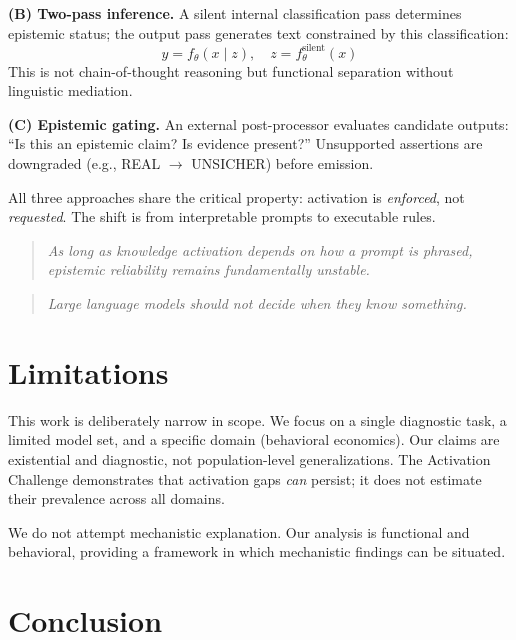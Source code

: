 \documentclass[11pt,a4paper]{article}
\begin{document}
\textbf{(B) Two-pass inference.} A silent internal classification pass determines epistemic status; the output pass generates text constrained by this classification:
\[
y = f_\theta(x \mid z), \quad z = f_\theta^{\text{silent}}(x)
\]
This is not chain-of-thought reasoning but functional separation without linguistic mediation.

\textbf{(C) Epistemic gating.} An external post-processor evaluates candidate outputs: ``Is this an epistemic claim? Is evidence present?'' Unsupported assertions are downgraded (e.g., REAL $\rightarrow$ UNSICHER) before emission.

All three approaches share the critical property: activation is \emph{enforced}, not \emph{requested}. The shift is from interpretable prompts to executable rules.

\begin{quote}
\textit{As long as knowledge activation depends on how a prompt is phrased, epistemic reliability remains fundamentally unstable.}
\end{quote}

\begin{quote}
\textit{Large language models should not decide when they know something.}
\end{quote}


\section{Limitations}

This work is deliberately narrow in scope. We focus on a single diagnostic task, a limited model set, and a specific domain (behavioral economics). Our claims are existential and diagnostic, not population-level generalizations. The Activation Challenge demonstrates that activation gaps \emph{can} persist; it does not estimate their prevalence across all domains.

We do not attempt mechanistic explanation. Our analysis is functional and behavioral, providing a framework in which mechanistic findings can be situated.


\section{Conclusion}
\end{document}
